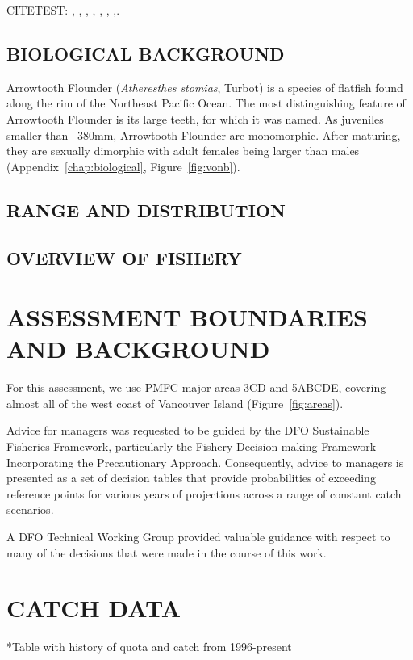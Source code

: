 CITETEST: \citet{arf1995}, \citet{arf1999a}, \citet{arf1999b}, \citet{arf2000}, \citet{arf2001}, \citet{arf2003}, \citet{arf2006},\citet{arf2013}.

\subsection{BIOLOGICAL BACKGROUND}

Arrowtooth Flounder (\emph{Atheresthes stomias}, Turbot) is a species of flatfish found along the rim of the Northeast Pacific Ocean. The most distinguishing feature of Arrowtooth Flounder is its large teeth, for which it was named. As juveniles smaller than ~380mm, Arrowtooth Flounder are monomorphic. After maturing, they are sexually dimorphic with adult females being larger than males (Appendix~\ref{chap:biological}, Figure~\ref{fig:vonb}).

\subsection{RANGE AND DISTRIBUTION}


\subsection{OVERVIEW OF FISHERY}


\section{ASSESSMENT BOUNDARIES AND BACKGROUND}

For this assessment, we use PMFC major areas 3CD and 5ABCDE, covering almost all of the west coast of Vancouver Island (Figure~\ref{fig:areas}).

Advice for managers was requested to be guided by the DFO Sustainable Fisheries Framework, particularly the Fishery Decision-making Framework Incorporating the Precautionary Approach. Consequently, advice to managers is presented as a set of decision tables that provide probabilities of exceeding reference points for various years of projections across a range of constant catch scenarios.

A DFO Technical Working Group provided valuable guidance with respect to many of the decisions that were made in the course of this work.

\section{CATCH DATA}
*Table with history of quota and catch from 1996-present

